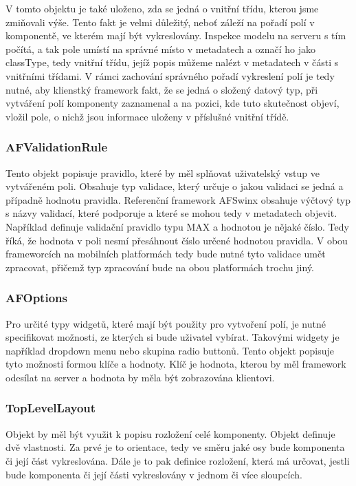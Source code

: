 V tomto objektu je také uloženo, zda se jedná o vnitřní třídu, kterou jsme zmiňovali výše. Tento fakt je velmi důležitý, neboť záleží na pořadí polí v komponentě, ve kterém mají být vykreslovány. Inspekce modelu na serveru s tím počítá, a tak pole umístí na správné místo v metadatech a označí ho jako classType, tedy vnitřní třídu, jejíž popis můžeme nalézt v metadatech v části s vnitřními třídami. V rámci zachování správného pořadí vykreslení polí je tedy nutné, aby klienstký framework fakt, že se jedná o složený datový typ, při vytváření polí komponenty zaznamenal a na pozici, kde tuto skutečnost objeví, vložil pole, o nichž jsou informace uloženy v příslušné vnitřní třídě.

\subsubsection{AFValidationRule}
Tento objekt popisuje pravidlo, které by měl splňovat uživatelský vstup ve vytvářeném poli. Obsahuje typ validace, který určuje o jakou validaci se jedná a případně hodnotu pravidla. Referenční framework AFSwinx obsahuje výčtový typ s názvy validací, které podporuje a které se mohou tedy v metadatech objevit. Například definuje validační pravidlo typu MAX a hodnotou je nějaké číslo. Tedy říká, že hodnota v poli nesmí přesáhnout číslo určené hodnotou pravidla. V obou frameworcích na mobilních platformách tedy bude nutné tyto validace umět zpracovat, přičemž typ zpracování bude na obou platformách trochu jiný. 

\subsubsection{AFOptions}
Pro určité typy widgetů, které mají být použity pro vytvoření polí, je nutné specifikovat možnosti, ze kterých si bude uživatel vybírat. Takovými widgety je například dropdown menu nebo skupina radio buttonů. Tento objekt popisuje tyto možnosti formou klíče a hodnoty. Klíč je hodnota, kterou by měl framework odesílat na server a hodnota by měla být zobrazována klientovi.

\subsubsection{TopLevelLayout}
Objekt by měl být využit k popisu rozložení celé komponenty. Objekt definuje dvě vlastnosti. Za prvé je to orientace, tedy ve směru jaké osy bude komponenta či její část vykreslována. Dále je to pak definice rozložení, která má určovat, jestli bude komponenta či její části vykreslovány v jednom či více sloupcích. 

